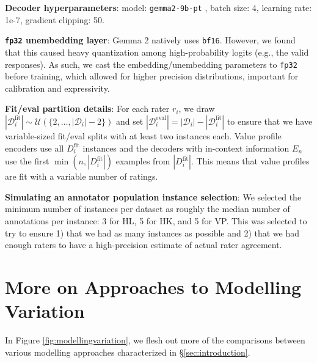 \documentclass[11pt]{article}
\begin{document}
\textbf{Decoder hyperparameters}: model: \texttt{gemma2-9b-pt} \citep{gemmateam2024gemma2improvingopen}, batch size: 4, learning rate: 1e-7, gradient clipping: 50.

\textbf{\texttt{fp32} unembedding layer}:
Gemma 2 \citep{gemmateam2024gemma2improvingopen} natively uses \texttt{bf16}. However, we found that this caused heavy quantization among high-probability logits (e.g., the valid responses). As such, we cast the embedding/unembedding parameters to \texttt{fp32} before training, which allowed for higher precision distributions, important for calibration and expressivity.

\textbf{Fit/eval partition details}: For each rater $r_i$, 
we draw $|\mathcal{D}_i^{\text{fit}}| \sim \mathcal{U}(\{2,\ldots,|\mathcal{D}_i|-2\})$ and set $|\mathcal{D}_i^\text{eval}| = |\mathcal{D}_i| - |\mathcal{D}_i^\text{fit}|$ to ensure that  we have variable-sized fit/eval splits with at least two instances each. Value profile encoders use all $D_i^\text{fit}$ instances and the decoders with in-context information $E_n$ use the first $\min(n, |D_i^\text{fit}|)$ examples from $|D_i^\text{fit}|$. This means that value profiles are fit with a variable number of ratings.

\textbf{Simulating an annotator population instance selection}: We selected the minimum number of instances per dataset as roughly the median number of annotations per instance: 3 for HL, 5 for HK, and 5 for VP. This was selected to try to ensure 1) that we had as many instances as possible and 2) that we had enough raters to have a high-precision estimate of actual rater agreement.


\section{More on Approaches to Modelling Variation}
\label{app:modellingvariation}

In Figure \ref{fig:modellingvariation}, we flesh out more of the comparisons between various modelling approaches characterized in \S \ref{sec:introduction}.

\end{document}
